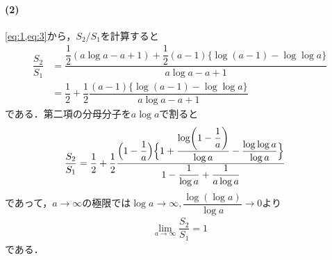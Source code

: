 \documentclass[../../main.tex]{subfiles}
\begin{document}
\paragraph{(2)}

\cref{eq:1,eq:3}から，$S_2/S_1$を計算すると
\begin{align}
  \dfrac{S_2}{S_1}
  &= \dfrac{\dfrac{1}{2}(a \log a - a + 1) + \dfrac{1}{2}(a-1)\{\log(a-1) - \log\log a\}}{a \log a - a + 1} \\
  &= \dfrac{1}{2} + \dfrac{1}{2} \dfrac{(a-1)\{\log(a-1) - \log\log a\}}{a \log a - a + 1}
\end{align}
である．第二項の分母分子を$a\log a$で割ると
\begin{align}
  \dfrac{S_2}{S_1}
  &= \dfrac{1}{2} + \dfrac{1}{2} \dfrac{\Bigl(1 - \dfrac{1}{a}\Bigr) \Bigl\{ 1 + \dfrac{\log(1 - \dfrac{1}{a})}{\log a} - \dfrac{\log\log a}{\log a} \Bigr\}}{1 - \dfrac{1}{\log a} + \dfrac{1}{a \log a}}
\end{align}
であって，$a\to\infty$の極限では$\log a\to\infty, \dfrac{\log(\log a)}{\log a}\to 0$より
\begin{align}
  \lim_{a\to\infty}\dfrac{S_2}{S_1} = 1
\end{align}
である．

\newpage
\end{document}
